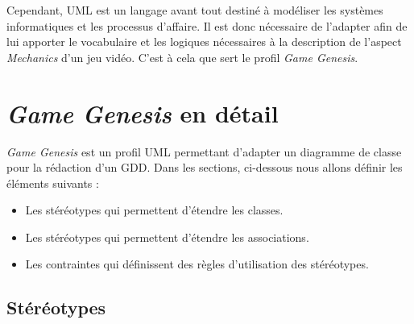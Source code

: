 Cependant, UML est un langage avant tout destiné à modéliser les systèmes informatiques et les processus d'affaire. 
Il est donc nécessaire de l'adapter afin de lui apporter le vocabulaire et les logiques nécessaires à la description de l'aspect \emph{Mechanics} d'un jeu vidéo.
C'est à cela que sert le profil \emph{Game Genesis}.
   




\section{\emph{Game Genesis} en détail}

\emph{Game Genesis} est un profil UML permettant d'adapter un diagramme de classe pour la rédaction d'un GDD.
Dans les sections, ci-dessous nous allons définir les éléments suivants :
\begin{itemize}
    \item Les stéréotypes qui permettent d'étendre les classes.
    \item Les stéréotypes qui permettent d'étendre les associations.
    \item Les contraintes qui d\'efinissent des règles d'utilisation des stéréotypes.
\end{itemize}

\subsection{Stéréotypes}



